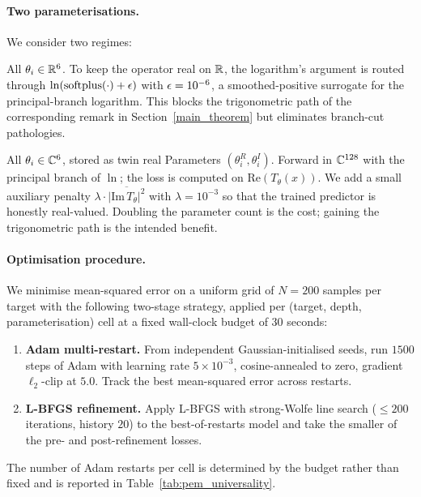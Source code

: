 \paragraph{Two parameterisations.}
We consider two regimes:
\begin{description}[itemsep=2pt, topsep=2pt]
\item[Real (R).] All $\theta_i \in \mathbb R^6$. To keep the operator real on
  $\mathbb R$, the logarithm's argument is routed through
  $\ln(\mathrm{softplus}(\cdot) + \epsilon)$ with $\epsilon = 10^{-6}$, a smoothed-positive
  surrogate for the principal-branch logarithm. This blocks the
  trigonometric path of the corresponding remark in
  Section~\ref{main_theorem} but eliminates branch-cut pathologies.
\item[Complex (C).] All $\theta_i \in \mathbb C^6$, stored as twin real
  Parameters $(\theta_i^R, \theta_i^I)$. Forward in $\mathbb C^{128}$ with the
  principal branch of $\ln$; the loss is computed on $\mathrm{Re}(T_\theta(x))$.
  We add a small auxiliary penalty $\lambda \cdot
  \overline{|\mathrm{Im}\,T_\theta|^2}$ with $\lambda = 10^{-3}$ so that
  the trained predictor is honestly real-valued. Doubling the parameter
  count is the cost; gaining the trigonometric path is the intended benefit.
\end{description}

\paragraph{Optimisation procedure.}
We minimise mean-squared error on a uniform grid of $N = 200$ samples per
target with the following two-stage strategy, applied per
(target, depth, parameterisation) cell at a fixed wall-clock budget of
$30$ seconds:
\begin{enumerate}[leftmargin=*, itemsep=2pt, topsep=2pt]
\item \textbf{Adam multi-restart.} From independent Gaussian-initialised
  seeds, run $1500$ steps of Adam with learning rate $5\times 10^{-3}$,
  cosine-annealed to zero, gradient $\ell_2$-clip at $5.0$. Track the
  best mean-squared error across restarts.
\item \textbf{L-BFGS refinement.} Apply L-BFGS with strong-Wolfe line
  search ($\leq 200$ iterations, history $20$) to the best-of-restarts
  model and take the smaller of the pre- and post-refinement losses.
\end{enumerate}
The number of Adam restarts per cell is determined by the budget rather
than fixed and is reported in Table~\ref{tab:pem_universality}.

